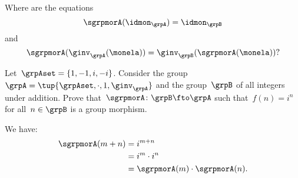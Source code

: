 Where are the equations
\begin{equation}
  \label{eq:grp-id-comp}
  \sgrpmorA (\idmon_\grpA) = \idmon_{\grpB}
\end{equation}
and
\begin{equation}
  \label{eq:grp-inv-comp}
  \sgrpmorA (\ginv_\grpA(\monela)) = \ginv_\grpB(\sgrpmorA(\monela))?
\end{equation}


\begin{exercise}
  Let~$\grpAset=\{1,-1,i,-i\}$. Consider the group~$\grpA=\tup{\grpAset, \cdot, 1, \ginv_\grpA}$ and the group~$\grpB$ of all integers under addition.
  Prove that~$\sgrpmorA\colon \grpB \fto \grpA$ such that~$f(n)=i^n$ for all~$n\in \grpB$ is a group morphism.
\end{exercise}
\begin{solution}
We have:
  \begin{equation*}
    \begin{aligned}
      \sgrpmorA(m+n)&=i^{m+n}\\
      &=i^m \cdot i^n\\
      &=\sgrpmorA(m)\cdot \sgrpmorA(n).
\end{aligned}
\end{equation*}
\end{solution}
